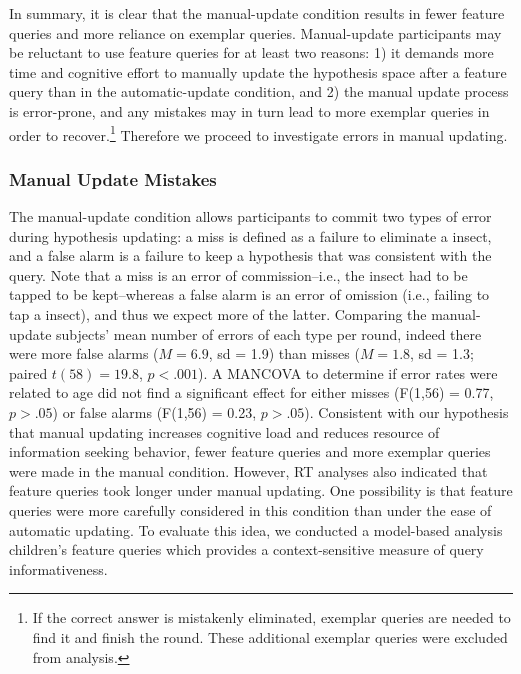 \documentclass[man,floatsintext]{apa6}
\begin{document}
 In summary, it is clear that the manual-update condition results in fewer feature 
queries and more reliance on exemplar queries. 
Manual-update participants may be reluctant to use feature queries for at least two reasons: 1) it demands more time and cognitive effort to manually update the hypothesis space after a feature query than 
in the automatic-update condition, and 2) the manual update process is error-prone, 
and any mistakes may in turn lead to more exemplar queries in order to recover.\footnote{If the correct answer is mistakenly eliminated, exemplar queries are needed to find it and finish the round. These additional exemplar queries were excluded from analysis.} 
Therefore we proceed to investigate errors in manual updating.

\subsubsection{Manual Update Mistakes}

The manual-update condition allows participants to commit two types of error during 
hypothesis updating: a miss is defined as a failure to eliminate a insect, and a false 
alarm is a failure to keep a hypothesis that was consistent with the query. Note that 
a miss is an error of commission--i.e., the insect had to be tapped to be kept--whereas 
a false alarm is an error of omission (i.e., failing to tap a insect), and thus we expect 
more of the latter. Comparing the manual-update subjects' mean number of errors of 
each type per round, indeed there were more false alarms ($M=6.9$, sd = 1.9) than 
misses ($M=1.8$, sd = 1.3; paired $t(58) = 19.8$, $p<.001$). A MANCOVA to 
determine if error rates were related to age did not find a significant effect for either 
misses (F(1,56) = 0.77, $p>.05$) or false alarms (F(1,56) = 0.23, $p>.05$).  Consistent
with our hypothesis that manual updating increases cognitive load and reduces
resource of information seeking behavior, fewer 
feature queries and more exemplar queries were made in the manual condition. 
However, RT analyses also indicated that 
feature queries took longer under manual updating.  One possibility is that
feature queries were more carefully considered in this condition than under 
the ease of automatic updating.  To evaluate this idea, we conducted a model-based
analysis children's feature queries which provides a context-sensitive measure of query
informativeness.
%
\end{document}

